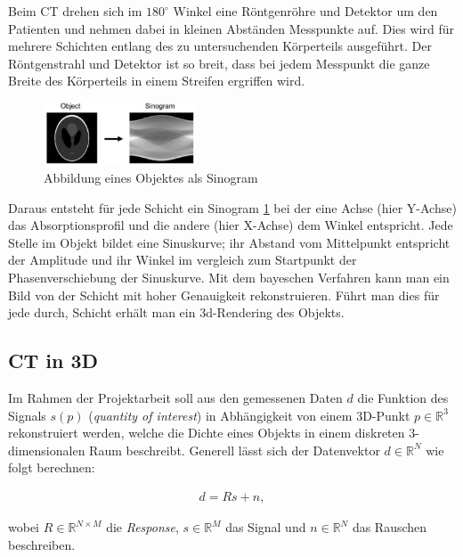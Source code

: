 Beim CT drehen sich im $180^\circ$ Winkel eine Röntgenröhre und Detektor um den Patienten und nehmen dabei in kleinen Abständen Messpunkte auf. Dies wird für mehrere Schichten entlang des zu untersuchenden Körperteils ausgeführt. Der Röntgenstrahl und Detektor ist so breit, dass bei jedem Messpunkt die ganze Breite des Körperteils in einem Streifen ergriffen wird.

\begin{figure}
 \centering
 \includegraphics[width=0.4\textwidth]{k4.2/backprojektion.png}
 \caption{Abbildung eines Objektes als Sinogram}
 \label{k4.2.tomo.ct.bp}
\end{figure}

Daraus entsteht für jede Schicht ein Sinogram \cref{k4.2.tomo.ct.bp} bei der eine Achse (hier Y-Achse) das Absorptionsprofil und die andere (hier X-Achse) dem Winkel entspricht. Jede Stelle im Objekt bildet eine Sinuskurve; ihr Abstand vom Mittelpunkt entspricht der Amplitude und ihr Winkel im vergleich zum Startpunkt der Phasenverschiebung der Sinuskurve. Mit dem bayeschen Verfahren  kann man ein Bild von der Schicht mit hoher Genauigkeit rekonstruieren. Führt man dies für jede durch, Schicht erhält man ein 3d-Rendering des Objekts.


\subsection{CT in 3D}\label{k4.2.ct.3d}

Im Rahmen der Projektarbeit soll aus den gemessenen Daten $d$ die Funktion des Signals $s(p)$ (\emph{quantity of interest}) in Abhängigkeit von einem 3D-Punkt $p \in \mathbb{R}^3$ rekonstruiert werden, welche die Dichte eines Objekts in einem diskreten 3-dimensionalen Raum beschreibt. Generell lässt sich der Datenvektor $d \in \mathbb{R}^N$ wie folgt berechnen:

\begin{equation}
  \label{k4.2.ct.3d.datamodel}
  \begin{aligned}
    d = Rs + n,
  \end{aligned}
\end{equation}

wobei $R \in \mathbb{R}^{N \times M}$ die \emph{Response}, $s \in \mathbb{R}^M$ das Signal und $n \in \mathbb{R}^N$ das Rauschen beschreiben. 

